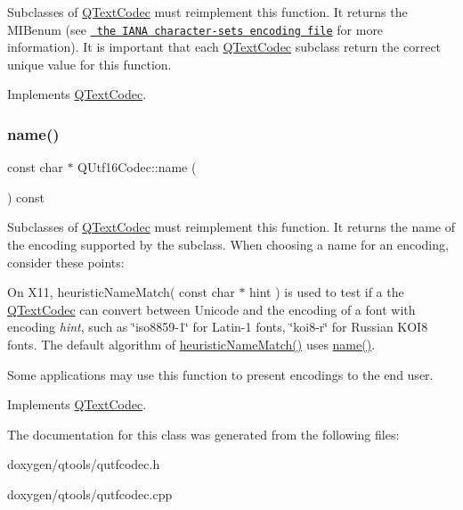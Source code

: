 Subclasses of \mbox{\hyperlink{class_q_text_codec}{Q\+Text\+Codec}} must reimplement this function. It returns the M\+I\+Benum (see \href{ftp://ftp.isi.edu/in-notes/iana/assignments/character-sets}{\texttt{ the I\+A\+NA character-\/sets encoding file}} for more information). It is important that each \mbox{\hyperlink{class_q_text_codec}{Q\+Text\+Codec}} subclass return the correct unique value for this function. 

Implements \mbox{\hyperlink{class_q_text_codec_aa0118daa4f82235ae9d5bb70a168c992}{Q\+Text\+Codec}}.

\mbox{\label{class_q_utf16_codec_ab5bf550f93083d25bf13f5f7497088db}} 
\subsubsection{\texorpdfstring{name()}{name()}}
{\footnotesize\ttfamily const char $\ast$ Q\+Utf16\+Codec\+::name (\begin{DoxyParamCaption}{ }\end{DoxyParamCaption}) const\hspace{0.3cm}{\ttfamily [virtual]}}

Subclasses of \mbox{\hyperlink{class_q_text_codec}{Q\+Text\+Codec}} must reimplement this function. It returns the name of the encoding supported by the subclass. When choosing a name for an encoding, consider these points\+: 
\begin{DoxyItemize}
\item On X11, heuristic\+Name\+Match( const char $\ast$ hint ) is used to test if a the \mbox{\hyperlink{class_q_text_codec}{Q\+Text\+Codec}} can convert between Unicode and the encoding of a font with encoding {\itshape hint}, such as \char`\"{}iso8859-\/1\char`\"{} for Latin-\/1 fonts, \char`\"{}koi8-\/r\char`\"{} for Russian K\+O\+I8 fonts. The default algorithm of \mbox{\hyperlink{class_q_text_codec_a1bcf2f11fac6113fd6ae74dda55b2ca4}{heuristic\+Name\+Match()}} uses \mbox{\hyperlink{class_q_utf16_codec_ab5bf550f93083d25bf13f5f7497088db}{name()}}. 
\item Some applications may use this function to present encodings to the end user. 
\end{DoxyItemize}

Implements \mbox{\hyperlink{class_q_text_codec_a5b735ce19dc6b0fb0e8858bd3f54f0e2}{Q\+Text\+Codec}}.



The documentation for this class was generated from the following files\+:\begin{DoxyCompactItemize}
\item 
doxygen/qtools/qutfcodec.\+h\item 
doxygen/qtools/qutfcodec.\+cpp\end{DoxyCompactItemize}
